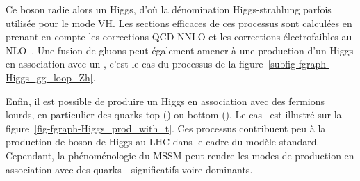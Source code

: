 Ce boson radie alors un Higgs, d'où la dénomination \og Higgs-strahlung \fg{} parfois utilisée pour le mode VH.
Les sections efficaces de ces processus sont calculées en prenant en compte les corrections QCD NNLO et les corrections électrofaibles au NLO~\cite{Higgs_xsec_book_4}.
Une fusion de gluons peut également amener à une production d'un Higgs en association avec un \Zboson, c'est le cas du processus de la figure~\ref{subfig-fgraph-Higgs_gg_loop_Zh}.
\par Enfin, il est possible de produire un Higgs en association avec des fermions lourds, en particulier des quarks top (\quarkt\antiquarkt\higgs) ou bottom (\quarkb\antiquarkb\higgs).
Le cas \quarkt\antiquarkt\higgs\ est illustré sur la figure~\ref{fig-fgraph-Higgs_prod_with_t}.
Ces processus contribuent peu à la production de boson de Higgs au LHC dans le cadre du modèle standard.
Cependant, la phénoménologie du MSSM peut rendre les modes de production en association avec des quarks~\quarkb\ significatifs voire dominants.
